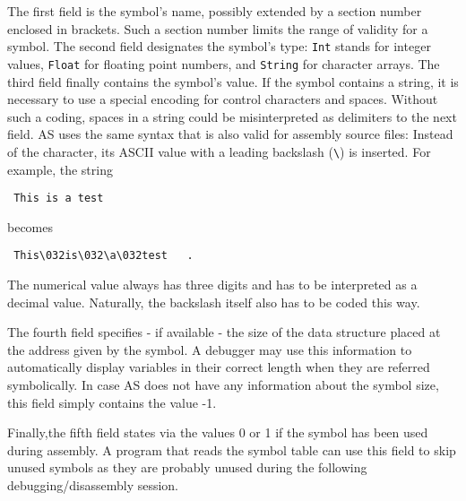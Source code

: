 \documentclass[12pt,twoside]{report}
\newcommand{\tty}[1]{{\tt #1}}
\begin{document}
The first field is the symbol's name, possibly extended by a section
number enclosed in brackets.  Such a section number limits the
range of validity for a symbol.  The second field designates the
symbol's type: \tty{Int} stands for integer values, \tty{Float} for floating
point numbers, and \tty{String} for character arrays.  The third field
finally contains the symbol's value.  If the symbol contains a
string, it is necessary to use a special encoding for control
characters and spaces.  Without such a coding, spaces in a string
could be misinterpreted as delimiters to the next field.  AS uses the
same syntax that is also valid for assembly source files: Instead of
the character, its ASCII value with a leading backslash (\verb!\!) is
inserted.  For example, the string
\begin{verbatim}
 This is a test
\end{verbatim}
becomes
\begin{verbatim}
 This\032is\032\a\032test   .
\end{verbatim}
The numerical value always has three digits and has to be interpreted
as a decimal value.  Naturally, the backslash itself also has to be
coded this way.

The fourth field specifies - if available - the size of the data
structure placed at the address given by the symbol.   A debugger may
use this information to automatically display variables in their
correct length when they are referred symbolically.  In case AS does
not have any information about the symbol size, this field simply
contains the value -1.

Finally,the fifth field states via the values 0 or 1 if the symbol
has been used during assembly.  A program that reads the symbol table
can use this field to skip unused symbols as they are probably unused
during the following debugging/disassembly session.
\end{document}
